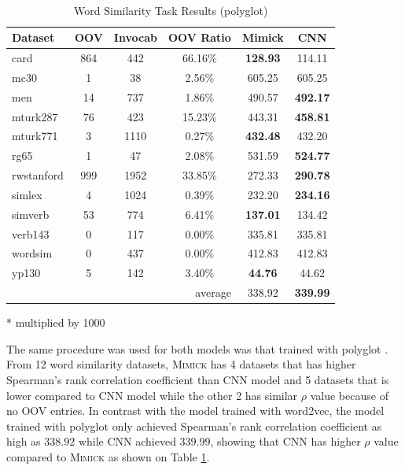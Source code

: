     \begin{table}[!ht]
      \begin{threeparttable} 
      \begin{center}
        \caption{Word Similarity Task Results (polyglot)}
        ~\\
        \label{tab:wordsim:polyglot}
        \begin{tabular}{l|c|c|c|c|c}
          \textbf{Dataset} & \textbf{OOV} & \textbf{Invocab} & \textbf{OOV Ratio} & \textbf{Mimick}\tnote{*} & \textbf{CNN}\tnote{*}\\
          \hline
          card & 864 & 442 & 66.16\% & \textbf{128.93} & 114.11\\
          mc30 & 1 & 38 & 2.56\% & 605.25 & 605.25\\
          men & 14 & 737 & 1.86\% & 490.57 & \textbf{492.17}\\
          mturk287 & 76 & 423 & 15.23\% & 443.31 & \textbf{458.81}\\
          mturk771 & 3 & 1110 & 0.27\% & \textbf{432.48} & 432.20\\
          rg65 & 1 & 47 & 2.08\% & 531.59 & \textbf{524.77}\\
          rwstanford & 999 & 1952 & 33.85\% & 272.33 & \textbf{290.78}\\
          simlex & 4 & 1024 & 0.39\% & 232.20 & \textbf{234.16}\\
          simverb & 53 & 774 & 6.41\% & \textbf{137.01} & 134.42\\
          verb143 & 0 & 117 & 0.00\% & 335.81 & 335.81\\
          wordsim & 0 & 437 & 0.00\% & 412.83 & 412.83\\
          yp130 & 5 & 142 & 3.40\% & \textbf{44.76} & 44.62\\
          \hline
          \multicolumn{4}{r|}{average} & 338.92 & \textbf{339.99}\\
        \end{tabular}
        \begin{tablenotes}
          \item[*] multiplied by 1000
        \end{tablenotes}
      \end{center}
    \end{threeparttable} 
    \end{table}

    The same procedure was used for both models was that trained with
    polyglot \citep{polyglot2013alrfou}. From 12 word similarity
    datasets, \textsc{Mimick} has 4 datasets that has higher
    Spearman's rank correlation coefficient than CNN model and 5
    datasets that is lower compared to CNN model while the other 2 has
    similar $\rho$ value because of no OOV entries. In contrast with
    the model trained with word2vec, the model trained with polyglot
    \citep{polyglot2013alrfou} only achieved Spearman's rank
    correlation coefficient as high as $338.92$ while CNN achieved $339.99$,
    showing that CNN has higher
    $\rho$ value compared to \textsc{Mimick} as shown on Table
    \ref{tab:wordsim:polyglot}.

